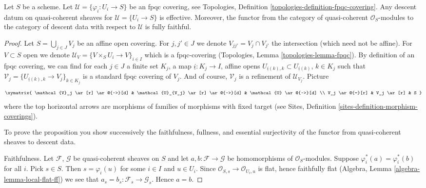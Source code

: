 \begin{proposition}
\label{proposition-fpqc-descent-quasi-coherent}
Let $S$ be a scheme.
Let $\mathcal{U} = \{\varphi_i : U_i \to S\}$ be an fpqc covering, see
Topologies, Definition \ref{topologies-definition-fpqc-covering}.
Any descent datum on quasi-coherent sheaves
for $\mathcal{U} = \{U_i \to S\}$ is effective.
Moreover, the functor from the category of
quasi-coherent $\mathcal{O}_S$-modules to the category
of descent data with respect to $\mathcal{U}$ is fully faithful.
\end{proposition}

\begin{proof}
Let $S = \bigcup_{j \in J} V_j$ be an affine open covering.
For $j, j' \in J$ we denote $V_{jj'} = V_j \cap V_{j'}$ the intersection
(which need not be affine). For $V \subset S$ open we denote
$\mathcal{U}_V = \{V \times_S U_i \to V\}_{i \in I}$ which is a
fpqc-covering (Topologies, Lemma \ref{topologies-lemma-fpqc}).
By definition of an fpqc covering, we can find for each $j \in J$ a
finite set $K_j$, a map $\underline{i} : K_j \to I$,
affine opens $U_{\underline{i}(k), k} \subset U_{\underline{i}(k)}$,
$k \in K_j$ such that
$\mathcal{V}_j = \{U_{\underline{i}(k), k} \to V_j\}_{k \in K_j}$ is
a standard fpqc covering of $V_j$. And of course, $\mathcal{V}_j$
is a refinement of $\mathcal{U}_{V_j}$. Picture
$$
\xymatrix{
\mathcal{V}_j \ar[r] \ar@{~>}[d] &
\mathcal{U}_{V_j} \ar[r] \ar@{~>}[d] &
\mathcal{U} \ar@{~>}[d] \\
V_j \ar@{=}[r] & V_j \ar[r] & S
}
$$
where the top horizontal arrows are morphisms of families of
morphisms with fixed target (see
Sites, Definition \ref{sites-definition-morphism-coverings}).

\medskip\noindent
To prove the proposition you show successively the
faithfulness, fullness, and essential surjectivity of the
functor from quasi-coherent sheaves to descent data.

\medskip\noindent
Faithfulness. Let $\mathcal{F}$, $\mathcal{G}$ be quasi-coherent
sheaves on $S$ and let $a, b : \mathcal{F} \to \mathcal{G}$ be
homomorphisms of $\mathcal{O}_S$-modules.
Suppose $\varphi_i^*(a) = \varphi_i^*(b)$ for all $i$.
Pick $s \in S$. Then $s = \varphi_i(u)$ for some $i \in I$ and
$u \in U_i$. Since $\mathcal{O}_{S, s} \to \mathcal{O}_{U_i, u}$
is flat, hence faithfully flat
(Algebra, Lemma \ref{algebra-lemma-local-flat-ff}) we see
that $a_s = b_s : \mathcal{F}_s \to \mathcal{G}_s$. Hence $a = b$.


\end{proof}
